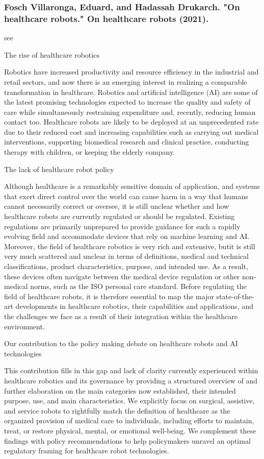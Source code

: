 \documentclass[conference]{IEEEtran}
\begin{document}
\medskip
\subsubsection{Fosch Villaronga, Eduard, and Hadassah Drukarch. "On healthcare robots." On healthcare robots (2021).}
see \cite{fosch2021healthcare}

The rise of healthcare robotics

Robotics  have  increased  productivity  and  resource  efficiency  in  the  industrial  and  retail sectors, and now there is an emerging interest in realizing a comparable transformation in healthcare.  Robotics  and  artificial  intelligence  (AI)  are  some  of  the  latest  promising technologies  expected  to  increase  the  quality  and  safety  of  care  while  simultaneously restraining expenditure and, recently, reducing human contact too. Healthcare robots are likely to be deployed at an unprecedented rate due to their reduced cost and increasing capabilities such  as  carrying  out  medical  interventions,  supporting  biomedical  research  and clinical practice, conducting therapy with children, or keeping the elderly company.

The lack of healthcare robot policy

Although healthcare is a remarkably sensitive domain of application, and systems that exert direct control over the world can cause harm in a way that humans cannot necessarily correct or oversee, it is still unclear whether and how healthcare robots are currently regulated or should be regulated. Existing regulations are primarily unprepared to provide guidance for such a rapidly evolving field and accommodate devices that rely on machine learning and AI. Moreover, the field of healthcare robotics is very rich and extensive, butit is still very much scattered and unclear in terms of definitions, medical and technical classifications, product characteristics, purpose, and intended use. As a result, these devices often navigate between the medical device regulation or other non-medical norms, such as the ISO personal care standard. Before regulating the field of healthcare robots, it is therefore essential to map the major state-of-the-art developments in healthcare robotics, their capabilities and applications, and the challenges we face as a result of their integration within the healthcare environment.

Our contribution to the policy making debate on healthcare robots and AI technologies

This contribution fills in this gap and lack of clarity currently experienced within healthcare robotics and its governance by providing a structured overview of and further elaboration on the main categories now established, their intended purpose, use, and main characteristics. We explicitly focus on surgical, assistive, and service robots to rightfully match the definition of healthcare as the organized provision of medical care to individuals, including efforts to maintain, treat, or restore physical, mental, or emotional well-being. We complement these findings with policy recommendations to help policymakers unravel an optimal regulatory framing for healthcare robot technologies.
\end{document}
